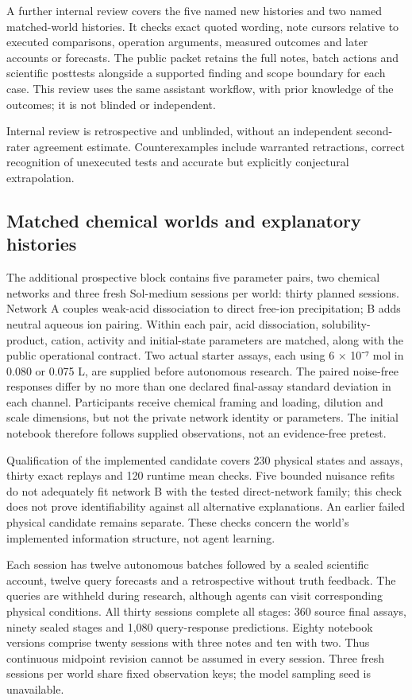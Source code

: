 \documentclass[10pt,a4paper]{article}
\begin{document}
A further internal review covers the five named new histories and two named matched-world histories. It checks exact quoted wording, note cursors relative to executed comparisons, operation arguments, measured outcomes and later accounts or forecasts. The public packet retains the full notes, batch actions and scientific posttests alongside a supported finding and scope boundary for each case. This review uses the same assistant workflow, with prior knowledge of the outcomes; it is not blinded or independent.

Internal review is retrospective and unblinded, without an independent second-rater agreement estimate. Counterexamples include warranted retractions, correct recognition of unexecuted tests and accurate but explicitly conjectural extrapolation.

\subsection{Matched chemical worlds and explanatory histories}\label{matched-chemical-worlds-and-explanatory-histories}

The additional prospective block contains five parameter pairs, two chemical networks and three fresh Sol-medium sessions per world: thirty planned sessions. Network A couples weak-acid dissociation to direct free-ion precipitation; B adds neutral aqueous ion pairing. Within each pair, acid dissociation, solubility-product, cation, activity and initial-state parameters are matched, along with the public operational contract. Two actual starter assays, each using 6 × 10⁻⁷ mol in 0.080 or 0.075 L, are supplied before autonomous research. The paired noise-free responses differ by no more than one declared final-assay standard deviation in each channel. Participants receive chemical framing and loading, dilution and scale dimensions, but not the private network identity or parameters. The initial notebook therefore follows supplied observations, not an evidence-free pretest.

Qualification of the implemented candidate covers 230 physical states and assays, thirty exact replays and 120 runtime mean checks. Five bounded nuisance refits do not adequately fit network B with the tested direct-network family; this check does not prove identifiability against all alternative explanations. An earlier failed physical candidate remains separate. These checks concern the world's implemented information structure, not agent learning.

Each session has twelve autonomous batches followed by a sealed scientific account, twelve query forecasts and a retrospective without truth feedback. The queries are withheld during research, although agents can visit corresponding physical conditions. All thirty sessions complete all stages: 360 source final assays, ninety sealed stages and 1,080 query-response predictions. Eighty notebook versions comprise twenty sessions with three notes and ten with two. Thus continuous midpoint revision cannot be assumed in every session. Three fresh sessions per world share fixed observation keys; the model sampling seed is unavailable.
\end{document}
